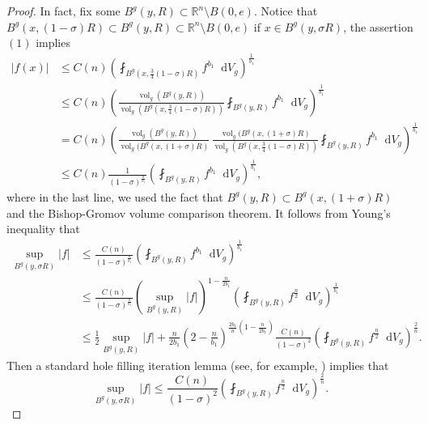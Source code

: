 \documentclass[10pt,a4paper]{amsart}
\numberwithin{equation}{section}
\newcommand{\dd}{\mathop{}\!\mathrm{d}}%
\begin{document}
\begin{proof}
    In fact, fix some $B^g(y,R)\subset \mathbb{R}^n\setminus B(0,e)$. Notice that $B^g(x,(1-\sigma)R)\subset B^g(y,R)\subset \mathbb{R}^n\setminus B(0,e)$ if $x\in B^g(y,\sigma R)$, the assertion $(1)$ implies
    \begin{align*}
        |f(x)|&\leq C(n) \left(
            \fint_{B^g(x,\frac{3}{4}(1-\sigma)R)}f^{b_1}\dd V_g
            \right)^{\frac{1}{b_1}}\\
            &\leq C(n)\left(
            \frac{\operatorname{vol}_g(B^g(y,R))}{\operatorname{vol}_g(B^g(x,\frac{3}{4}(1-\sigma)R))}
            \fint_{B^g(y,R)}f^{b_1}\dd V_g
            \right)^{\frac{1}{b_1}}\\
            &=C(n)\left(
            \frac{\operatorname{vol}_g(B^g(y,R))}{\operatorname{vol}_g(B^g(x,(1+\sigma)R)}\,
            \frac{\operatorname{vol}_g(B^g(x,(1+\sigma)R)}{\operatorname{vol}_g(B^g(x,\frac{3}{4}(1-\sigma)R))}
            \fint_{B^g(y,R)}f^{b_1}\dd V_g
            \right)^{\frac{1}{b_1}}\\
            &\leq C(n)\frac{1}{(1-\sigma)^{\frac{n}{b_1}}}\left(
            \fint_{B^g(y,R)}f^{b_1}\dd V_g
            \right)^{\frac{1}{b_1}},
    \end{align*}
    where in the last line, we used the fact that $B^g(y,R)\subset B^g(x,(1+\sigma)R)$ and the Bishop-Gromov volume comparison theorem.
    It follows from Young's inequality that
    \begin{align*}
        \sup _{B^g(y,\sigma R)}|f|
        &\leq \frac{C(n)}{(1-\sigma)^{\frac{n}{b_1}}} \left(
            \fint_{B^g(y,R)}f^{b_1}\dd V_g
        \right)^{\frac{1}{b_1}}\\
        &\leq \frac{C(n)}{(1-\sigma)^{\frac{n}{b_1}}}
        (\sup_{B^g(y,R)}|f|)^{1-\frac{n}{2b_1}}
        \left(
            \fint_{B^g(y,R)}f^{\frac{n}{2}}\dd V_g
        \right)^{\frac{1}{b_1}}\\
        &\leq \frac{1}{2}\sup_{B^g(y,R)} |f|
        +\frac{n}{2b_1}
        \left(2-\frac{n}{b_1}\right)
        ^{\frac{2b_1}{n}(1-\frac{n}{2b_1})}
        \frac{C(n)}{(1-\sigma)^2}
        \left(
            \fint_{B^g(y,R)}f^{\frac{n}{2}}\dd V_g
        \right)^{\frac{2}{n}}.
    \end{align*}
    Then a standard hole filling iteration lemma (see, for example, \cite[Lemma 3]{BC}) implies that 
    \[
        \sup_{B^g(y,\sigma R)}|f|\leq \frac{C(n)}{(1-\sigma)^2}
        \left(
            \fint_{B^g(y,R)}f^{\frac{n}{2}}\dd V_g
        \right)^{\frac{2}{n}}.
    \]
\end{proof}
\end{document}
